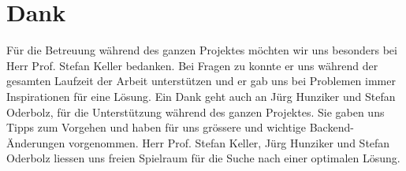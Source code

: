 \chapter*{Dank}
\thispagestyle{scrheadings}

Für die Betreuung während des ganzen Projektes möchten wir uns besonders bei Herr Prof. Stefan
Keller bedanken.
Bei Fragen zu  konnte er uns während der gesamten Laufzeit der Arbeit unterstützen und er gab uns bei Problemen immer Inspirationen für eine Lösung. 
Ein Dank geht auch an Jürg Hunziker und Stefan Oderbolz, für die Unterstützung während des ganzen Projektes.
Sie gaben uns Tipps zum Vorgehen und haben für uns grössere und wichtige Backend-Änderungen vorgenommen. 
Herr Prof. Stefan Keller, Jürg Hunziker und Stefan Oderbolz liessen uns freien Spielraum für die Suche nach einer optimalen Lösung.
